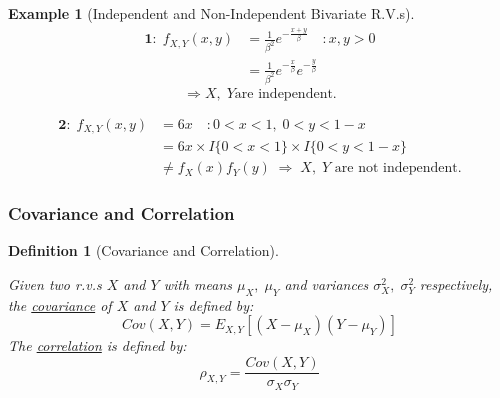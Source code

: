\documentclass[12pt,a4paper]{article}
\newtheorem{defn}[thm]{Definition}
\newtheorem{ex}[thm]{Example}
\begin{document}
\begin{ex}[Independent and Non-Independent Bivariate R.V.s]

\begin{align*}
\mathbf{1\!: }\; f_{X,Y}(x,y) &= \frac{1}{\beta^2}e^{-\frac{x+y}{\beta}}\quad : x,y>0\\
&= \frac{1}{\beta^2}e^{-\frac{x}{\beta}}e^{-\frac{y}{\beta}}
\end{align*}
$$\Rightarrow X,\;Y \text{are independent.}$$

\begin{align*}
\mathbf{2\!: }\; f_{X,Y}(x,y) &= 6x\quad : 0<x<1,\; 0<y<1-x\\
&= 6x \times I\{0<x<1\} \times I\{0<y<1-x\}\\
&\neq f_X(x)f_Y(y)\; \Rightarrow\; X,\; Y \text{ are not independent.}
\end{align*}

\end{ex}

\subsubsection{Covariance and Correlation}

\begin{defn}[Covariance and Correlation]$\;$\par\vspace{1cm}

Given two r.v.s $X$ and $Y$ with means $\mu_X,\; \mu_Y$ and variances $\sigma_X^2,\; \sigma_Y^2$ respectively, the \underline{covariance} of $X$ and $Y$ is defined by:
$$Cov(X,Y) = E_{X,Y}[(X-\mu_X)(Y-\mu_Y)]$$
The \underline{correlation} is defined by:
$$\rho_{X,Y} = \frac{Cov(X,Y)}{\sigma_X \sigma_Y}$$
\end{defn}
\end{document}
